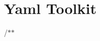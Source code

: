 \chapter{Yaml Toolkit}
\hypertarget{index}{}\label{index}
\label{index_md_README}%
%
 /\texorpdfstring{$\ast$}{*}\texorpdfstring{$\ast$}{*}
\begin{DoxyItemize}
\item 
\end{DoxyItemize}